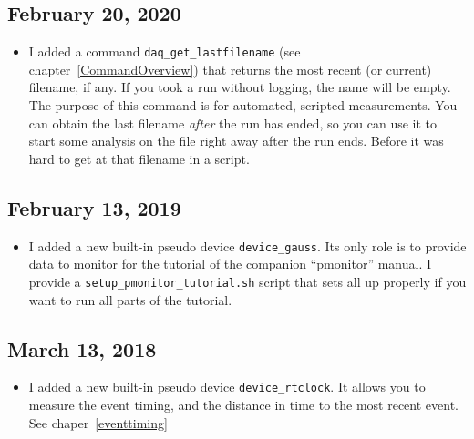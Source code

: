 \documentclass{article}[11pt]
\begin{document}
\subsection{February 20, 2020}
\begin{itemize}
\item I added a command \verb|daq_get_lastfilename| (see
  chapter~\ref{CommandOverview}) that returns the most recent (or
  current) filename, if any. If you took a run without logging, the
  name will be empty. The purpose of this command is for automated,
  scripted measurements. You can obtain the last filename \emph{after}
  the run has ended, so you can use it to start some analysis on the
  file right away after the run ends. Before it was hard to get at
  that filename in a script.

\end{itemize}

\subsection{February 13, 2019}
\begin{itemize}
\item I added a new built-in pseudo device \verb|device_gauss|.  Its
  only role is to provide data to monitor for the tutorial of the
  companion ``pmonitor'' manual. I provide a
  \verb|setup_pmonitor_tutorial.sh| script that sets all up properly if you want
  to run all parts of the tutorial.
\end{itemize}


\subsection{March 13, 2018}
\begin{itemize}
\item I added a new built-in pseudo device \verb|device_rtclock|.  It
  allows you to measure the event timing, and the distance in time to
  the most recent event. See chaper~\ref{eventtiming}
\end{itemize}
\end{document}
